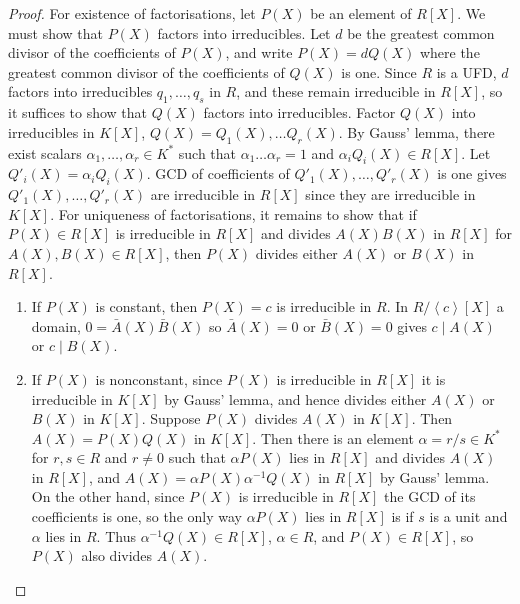 \documentclass{article}
\newcommand{\rb}[1]{\left( #1 \right)}
\renewcommand{\sb}[1]{\left[ #1 \right]}
\newcommand{\ab}[1]{\left\langle #1 \right\rangle}
\theoremstyle{definition}\newtheorem{definition}{Definition}[subsection]
\theoremstyle{definition}\newtheorem{remark}[definition]{Remark}
\theoremstyle{definition}\newtheorem*{example}{Example}
\theoremstyle{definition}\newtheorem*{note}{Note}
\begin{document}
\begin{proof}
For existence of factorisations, let $ P\rb{X} $ be an element of $ R\sb{X} $. We must show that $ P\rb{X} $ factors into irreducibles. Let $ d $ be the greatest common divisor of the coefficients of $ P\rb{X} $, and write $ P\rb{X} = dQ\rb{X} $ where the greatest common divisor of the coefficients of $ Q\rb{X} $ is one. Since $ R $ is a UFD, $ d $ factors into irreducibles $ q_1, \dots, q_s $ in $ R $, and these remain irreducible in $ R\sb{X} $, so it suffices to show that $ Q\rb{X} $ factors into irreducibles. Factor $ Q\rb{X} $ into irreducibles in $ K\sb{X} $, $ Q\rb{X} = Q_1\rb{X}, \dots Q_r\rb{X} $. By Gauss' lemma, there exist scalars $ \alpha_1, \dots, \alpha_r \in K^* $ such that $ \alpha_1 \dots \alpha_r = 1 $ and $ \alpha_iQ_i\rb{X} \in R\sb{X} $. Let $ Q'_i \rb{X} = \alpha_iQ_i\rb{X} $. GCD of coefficients of $ Q'_1\rb{X}, \dots, Q'_r\rb{X} $ is one gives $ Q'_1\rb{X}, \dots, Q'_r\rb{X} $ are irreducible in $ R\sb{X} $ since they are irreducible in $ K\sb{X} $. For uniqueness of factorisations, it remains to show that if $ P\rb{X} \in R\sb{X} $ is irreducible in $ R\sb{X} $ and divides $ A\rb{X}B\rb{X} $ in $ R\sb{X} $ for $ A\rb{X}, B\rb{X} \in R\sb{X} $, then $ P\rb{X} $ divides either $ A\rb{X} $ or $ B\rb{X} $ in $ R\sb{X} $.
\begin{enumerate}
\item If $ P\rb{X} $ is constant, then $ P\rb{X} = c $ is irreducible in $ R $. In $ R / \ab{c}\sb{X} $ a domain, $ 0 = \bar{A}\rb{X}\bar{B}\rb{X} $ so $ \bar{A}\rb{X} = 0 $ or $ \bar{B}\rb{X} = 0 $ gives $ c \mid A\rb{X} $ or $ c \mid B\rb{X} $.
\item If $ P\rb{X} $ is nonconstant, since $ P\rb{X} $ is irreducible in $ R\sb{X} $ it is irreducible in $ K\sb{X} $ by Gauss' lemma, and hence divides either $ A\rb{X} $ or $ B\rb{X} $ in $ K\sb{X} $. Suppose $ P\rb{X} $ divides $ A\rb{X} $ in $ K\sb{X} $. Then $ A\rb{X} = P\rb{X}Q\rb{X} $ in $ K\sb{X} $. Then there is an element $ \alpha = r / s \in K^* $ for $ r, s \in R $ and $ r \ne 0 $ such that $ \alpha P\rb{X} $ lies in $ R\sb{X} $ and divides $ A\rb{X} $ in $ R\sb{X} $, and $ A\rb{X} = \alpha P\rb{X}\alpha^{-1} Q\rb{X} $ in $ R\sb{X} $ by Gauss' lemma. On the other hand, since $ P\rb{X} $ is irreducible in $ R\sb{X} $ the GCD of its coefficients is one, so the only way $ \alpha P\rb{X} $ lies in $ R\sb{X} $ is if $ s $ is a unit and $ \alpha $ lies in $ R $. Thus $ \alpha^{-1}Q\rb{X} \in R\sb{X} $, $ \alpha \in R $, and $ P\rb{X} \in R\sb{X} $, so $ P\rb{X} $ also divides $ A\rb{X} $.
\end{enumerate}
\end{proof}
\end{document}
